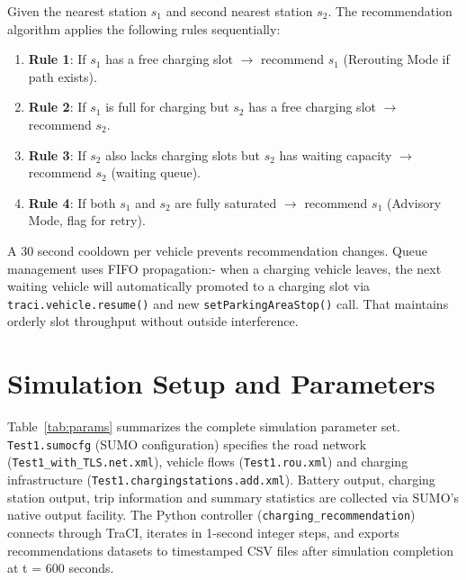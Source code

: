 \documentclass[conference]{IEEEtran}
\begin{document}
Given the nearest station $s_1$ and second nearest station $s_2$. The
recommendation algorithm applies the following rules sequentially:
\begin{enumerate}
  \item \textbf{Rule 1}: If $s_1$ has a free charging slot $\rightarrow$
        recommend $s_1$ (Rerouting Mode if path exists).
  \item \textbf{Rule 2}: If $s_1$ is full for charging but $s_2$ has a
        free charging slot $\rightarrow$ recommend $s_2$.
  \item \textbf{Rule 3}: If $s_2$ also lacks charging slots but $s_2$
        has waiting capacity $\rightarrow$ recommend $s_2$ (waiting queue).
  \item \textbf{Rule 4}: If both $s_1$ and $s_2$ are fully saturated
        $\rightarrow$ recommend $s_1$ (Advisory Mode, flag for retry).
\end{enumerate}

A 30 second cooldown per vehicle prevents recommendation changes. Queue
management uses FIFO propagation:- when a charging vehicle leaves, the
next waiting vehicle will automatically promoted to a charging slot via
\texttt{traci.vehicle.resume()} and new \texttt{setParkingAreaStop()}
call. That maintains orderly slot throughput without outside
interference.

\section{Simulation Setup and Parameters}

Table~\ref{tab:params} summarizes the complete simulation parameter
set. \texttt{Test1.sumocfg} (SUMO configuration) specifies the road
network (\texttt{Test1\_with\_TLS.net.xml}), vehicle flows
(\texttt{Test1.rou.xml}) and charging infrastructure
(\texttt{Test1.chargingstations.add.xml}). Battery output, charging
station output, trip information and summary statistics are collected
via SUMO's native output facility. The Python controller
(\texttt{charging\_recommendation}) connects through TraCI, iterates in
1-second integer steps, and exports recommendations datasets to
timestamped CSV files after simulation completion at t = 600 seconds.
\end{document}

